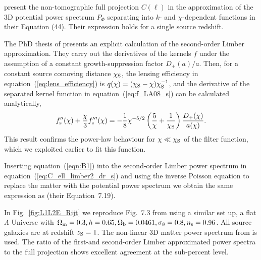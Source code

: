 \documentclass[fleqn,usenatbib]{mnras} %
\begin{document}
\begin{appendix}
\cite{2012PhRvD..86b3001B} present the non-tomographic full projection
$C(\ell)$ in the approximation of the 3D potential power spectrum $P_\Phi$
separating into $k$- and $\chi$-dependent functions in their Equation (44).
Their expression holds for a single source redshift.

The PhD thesis of \cite{vande2012} presents an explicit calculation of the
second-order Limber approximation. They carry out the derivatives of the
kernels $f$ under the assumption of a constant growth-suppression factor
$D_+(a)/a$. Then, for a constant source comoving distance $\chi_{\rm S}$, the
lensing efficiency in equation~(\ref{eq:lens_efficiency}) is $q(\chi) =
(\chi_{\rm S} - \chi) \chi_{\rm S}^{-1}$, and the derivative of the separated
kernel function in equation~(\ref{eq:f_LA08_s}) can be calculated analytically,
%
\begin{equation}
  f_{\rm s}^{\prime\prime}(\chi) + \frac{\chi}{3} f_{\rm s}^{\prime\prime\prime}(\chi)
    = - \frac 1 8 \chi^{-5/2} \left( \frac 5 \chi
          + \frac 1 {\chi_{\rm S}} \right) \frac{D_+(\chi)}{a(\chi)}.
\label{eqn:B1}
\end{equation}
%
This result confirms the power-law behaviour for $\chi \ll \chi_{\rm S}$ of the
filter function, which we exploited earlier to fit this function.

Inserting equation~(\ref{eqn:B1}) into the second-order Limber power spectrum
in equation~(\ref{eq:C_ell_limber2_dr_s}) and using the inverse Poisson
equation to replace the matter with the potential power spectrum we obtain the
same expression as \cite{vande2012} (their Equation~7.19).

In Fig.~\ref{fig:L1L2E_Rijt} we reproduce Fig.~7.3 from \cite{vande2012} using
a similar set up, a flat $\Lambda$ Universe with $\Omega_{\rm m} = 0.3, h=0.65,
\Omega_{\rm b} = 0.0461, \sigma_8 = 0.8, n_{\rm s} = 0.96$. All source galaxies
are at redshift $z_{\rm S} = 1$. The non-linear 3D matter power spectrum from
\cite{2012ApJ...761..152T} is used. The ratio of the first-and second-order
Limber approximated power spectra to the full projection shows excellent
agreement at the sub-percent level.

\begin{figure}


\end{figure}
\end{appendix}
\end{document}
